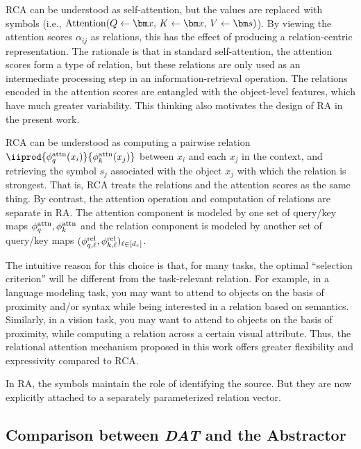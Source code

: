 RCA can be understood as self-attention, but the values are replaced with symbols (i.e., $\Attn(Q \gets \x,\, K \gets \x,\, V \gets \s)$). By viewing the attention scores $\alpha_{ij}$ as relations, this has the effect of producing a relation-centric representation. The rationale is that in standard self-attention, the attention scores form a type of relation, but these relations are only used as an intermediate processing step in an information-retrieval operation. The relations encoded in the attention scores are entangled with the object-level features, which have much greater variability. This thinking also motivates the design of RA in the present work.

RCA can be understood as computing a pairwise relation $\iiprod{\phiqattn(x_i)}{\phikattn(x_j)}$ between $x_i$ and each $x_j$ in the context, and retrieving the symbol $s_j$ associated with the object $x_j$ with which the relation is strongest. That is, RCA treats the relations and the attention scores as the same thing. By contrast, the attention operation and computation of relations are separate in RA. The attention component is modeled by one set of query/key maps $\phi_q^{\mathrm{attn}}, \phi_k^{\mathrm{attn}}$ and the relation component is modeled by another set of query/key maps $(\phi_{q, \ell}^{\mathrm{rel}}, \phi_{k, \ell}^{\mathrm{rel}})_{\ell \in [d_r]}$.

The intuitive reason for this choice is that, for many tasks, the optimal ``selection criterion'' will be different from the task-relevant relation. For example, in a language modeling task, you may want to attend to objects on the basis of proximity and/or syntax while being interested in a relation based on semantics. Similarly, in a vision task, you may want to attend to objects on the basis of proximity, while computing a relation across a certain visual attribute. Thus, the relational attention mechanism proposed in this work offers greater flexibility and expressivity compared to RCA.

In RA, the symbols maintain the role of identifying the source. But they are now explicitly attached to a separately parameterized relation vector.

\subsection{Comparison between \textit{DAT} and the Abstractor}

